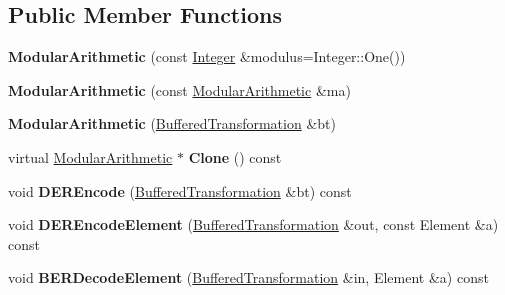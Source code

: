 \subsection*{Public Member Functions}
\begin{DoxyCompactItemize}
\item 
\hypertarget{class_modular_arithmetic_a1cdfc924e8d11f9620bd826535aabb62}{
{\bfseries ModularArithmetic} (const \hyperlink{class_integer}{Integer} \&modulus=Integer::One())}
\label{class_modular_arithmetic_a1cdfc924e8d11f9620bd826535aabb62}

\item 
\hypertarget{class_modular_arithmetic_a7a7bf808b07baa755ed9ce9f300ce743}{
{\bfseries ModularArithmetic} (const \hyperlink{class_modular_arithmetic}{ModularArithmetic} \&ma)}
\label{class_modular_arithmetic_a7a7bf808b07baa755ed9ce9f300ce743}

\item 
\hypertarget{class_modular_arithmetic_aa13202d33f899282fa10019f6ac31427}{
{\bfseries ModularArithmetic} (\hyperlink{class_buffered_transformation}{BufferedTransformation} \&bt)}
\label{class_modular_arithmetic_aa13202d33f899282fa10019f6ac31427}

\item 
\hypertarget{class_modular_arithmetic_a78b01c25c168c43fba14726dc919574c}{
virtual \hyperlink{class_modular_arithmetic}{ModularArithmetic} $\ast$ {\bfseries Clone} () const }
\label{class_modular_arithmetic_a78b01c25c168c43fba14726dc919574c}

\item 
\hypertarget{class_modular_arithmetic_aba88499eea9ee645c04cab392bbbd977}{
void {\bfseries DEREncode} (\hyperlink{class_buffered_transformation}{BufferedTransformation} \&bt) const }
\label{class_modular_arithmetic_aba88499eea9ee645c04cab392bbbd977}

\item 
\hypertarget{class_modular_arithmetic_a27dc1aa752d09041ed66391dff7086cc}{
void {\bfseries DEREncodeElement} (\hyperlink{class_buffered_transformation}{BufferedTransformation} \&out, const Element \&a) const }
\label{class_modular_arithmetic_a27dc1aa752d09041ed66391dff7086cc}

\item 
\hypertarget{class_modular_arithmetic_a795cefe1d831bd60defc31ccce945fe7}{
void {\bfseries BERDecodeElement} (\hyperlink{class_buffered_transformation}{BufferedTransformation} \&in, Element \&a) const }
\label{class_modular_arithmetic_a795cefe1d831bd60defc31ccce945fe7}


\end{DoxyCompactItemize}
